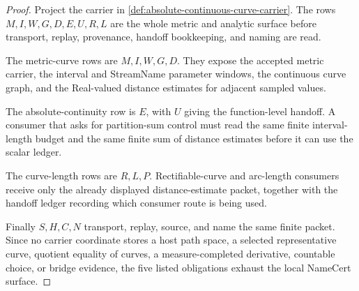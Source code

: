 \begin{proof}
Project the carrier in \autoref{def:absolute-continuous-curve-carrier}. The rows $M,I,W,G,D,E,U,R,L$ are the whole metric and analytic surface before transport, replay, provenance, handoff bookkeeping, and naming are read.

The metric-curve rows are $M,I,W,G,D$. They expose the accepted metric carrier, the interval and StreamName parameter windows, the continuous curve graph, and the Real-valued distance estimates for adjacent sampled values.

The absolute-continuity row is $E$, with $U$ giving the function-level handoff. A consumer that asks for partition-sum control must read the same finite interval-length budget and the same finite sum of distance estimates before it can use the scalar ledger.

The curve-length rows are $R,L,P$. Rectifiable-curve and arc-length consumers receive only the already displayed distance-estimate packet, together with the handoff ledger recording which consumer route is being used.

Finally $S,H,C,N$ transport, replay, source, and name the same finite packet. Since no carrier coordinate stores a host path space, a selected representative curve, quotient equality of curves, a measure-completed derivative, countable choice, or bridge evidence, the five listed obligations exhaust the local NameCert surface.
\end{proof}

